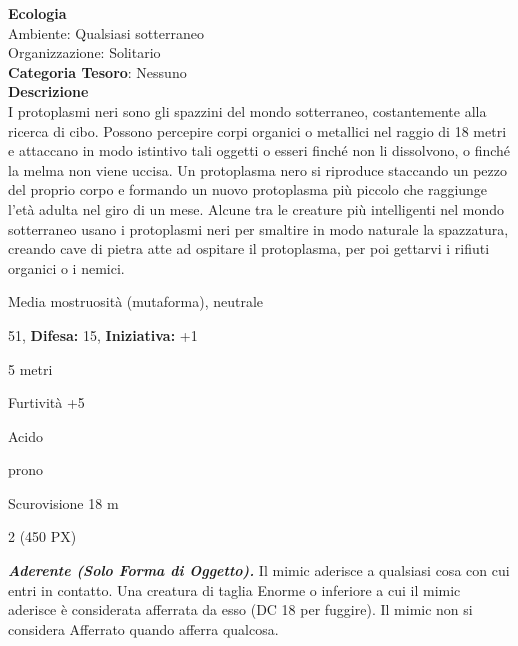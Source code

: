 \begin{multicols}{2}
{\textbf{Ecologia}\\
Ambiente: Qualsiasi sotterraneo\\
Organizzazione: Solitario\\
\textbf{Categoria Tesoro}: Nessuno\\
\textbf{Descrizione}\\
I protoplasmi neri sono gli spazzini del mondo sotterraneo, costantemente alla ricerca di cibo. Possono percepire corpi organici o metallici nel raggio di 18 metri e attaccano in modo istintivo tali oggetti o esseri finché non li dissolvono, o finché la melma non viene uccisa. Un protoplasma nero si riproduce staccando un pezzo del proprio corpo e formando un nuovo protoplasma più piccolo che raggiunge l'età adulta nel giro di un mese. Alcune tra le creature più intelligenti nel mondo sotterraneo usano i protoplasmi neri per smaltire in modo naturale la spazzatura, creando cave di pietra atte ad ospitare il protoplasma, per poi gettarvi i rifiuti organici o i nemici.

\noindent
\begin{description}[noitemsep, topsep=0pt, parsep=0pt, partopsep=0pt, leftmargin=0cm, labelwidth=2.2cm]
	\item[\textbf{Taglia/Tipo:}] Media mostruosità (mutaforma), neutrale
	\item[\textbf{Caratt.:}] 
	\item[\textbf{Punti Ferita:}] 51,  \textbf{Difesa:} 15,  \textbf{Iniziativa:} +1
	\item[\textbf{Movimento:}] 5 metri
	\item[\textbf{Tiri Salvez.:}] 
	\item[\textbf{Comp.:}] Furtività +5
	\item[\textbf{Imm. Danni:}] Acido
	\item[\textbf{Immunità:}] prono
	\item[\textbf{Sensi:}] Scurovisione 18 m
	\item[\textbf{Sfida:}] 2 (450 PX)\smallskip
\end{description}

\emph{\textbf{Aderente (Solo Forma di Oggetto).}} Il mimic aderisce a qualsiasi cosa con cui entri in contatto. Una creatura di taglia Enorme o inferiore a cui il mimic aderisce è considerata afferrata da esso (DC 18 per fuggire). Il mimic non si considera Afferrato quando afferra qualcosa.

}
\end{multicols}
